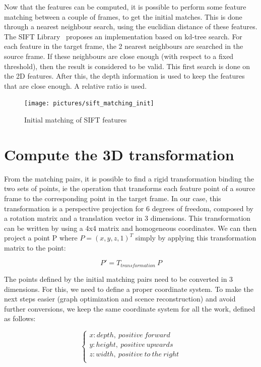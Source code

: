 Now that the features can be computed, it is possible to perform some feature matching between a couple of frames, to get the initial matches. This is done through a nearest neighbour search, using the euclidian distance of these features.  
The SIFT Library~\cite{hess_sift} proposes an implementation based on kd-tree search. For each feature in the target frame, the 2 nearest neighbours are searched in the source frame. If these neighbours are close enough (with respect to a fixed threshold), then the result is considered to be valid. This first search is done on the 2D features.
After this, the depth information is used to keep the features that are close enough. A relative ratio is used.

\begin{figure}[h!]
\centering
\texttt{[image: pictures/sift\_matching\_init]}
\caption{Initial matching of SIFT features}
\end{figure}

\section{Compute the 3D transformation}

From the matching pairs, it is possible to find a rigid transformation binding the two sets of points, ie the operation that transforms each feature point of a source frame to the corresponding point in the target frame. In our case, this transformation is a perspective projection for 6 degrees of freedom, composed by a rotation matrix and a translation vector in 3 dimensions. This transformation can be written by using a 4x4  matrix and homogeneous coordinates. We can then project a point P where $P = (x,y,z,1)^T$ simply by applying this transformation matrix to the point:

\[
P' = T_{transformation} \: P
\]

The points defined by the initial matching pairs need to be converted in 3 dimensions. For this, we need to define a proper coordinate system. To make the next steps easier (graph optimization and scence reconstruction) and avoid further conversions, we keep the same coordinate system for all the work, defined as follows:

\[
\left\{\begin{array}{l}
x: depth,\:positive\:forward\\
y: height,\:positive\:upwards\\
z: width,\:positive\:to\:the\:right\\
\end{array}
\right.
\]

